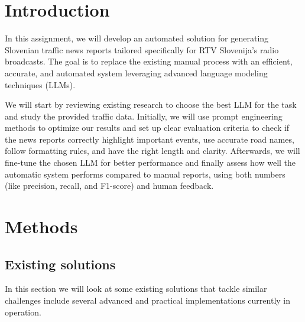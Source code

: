 \documentclass[fleqn,moreauthors,10pt]{ds_report}
\affiliation{\textit{Advisors: Slavko Žitnik}}
\begin{document}
\flushbottom 

\maketitle 

\thispagestyle{empty} 


\section*{Introduction}
    In this assignment, we will develop an automated solution for generating Slovenian traffic news reports tailored specifically for RTV Slovenija's radio broadcasts. The goal is to replace the existing manual process with an efficient, accurate, and automated system leveraging advanced language modeling techniques (LLMs).
    
    We will start by reviewing existing research to choose the best LLM for the task and study the provided traffic data. Initially, we will use prompt engineering methods to optimize our results and set up clear evaluation criteria to check if the news reports correctly highlight important events, use accurate road names, follow formatting rules, and have the right length and clarity. Afterwards, we will fine-tune the chosen LLM for better performance and finally assess how well the automatic system performs compared to manual reports, using both numbers (like precision, recall, and F1-score) and human feedback.



\section{Methods}

\subsection{Existing solutions}

In this section we will look at some existing solutions that tackle similar challenges include several advanced and practical implementations currently in operation.
\end{document}
